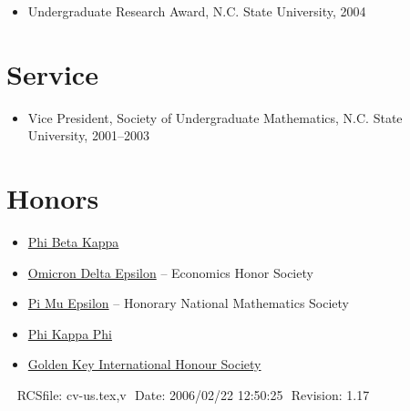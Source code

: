 \documentclass[overlapped,line,final,11pt,letterpaper]{res}
\def\Cplusplus{{\rm C\raise.5ex\hbox{\small ++}}}
\begin{document}
\begin{resume}
\begin{itemize}
\item Undergraduate Research Award, N.C. State University, 2004
\end{itemize}


\section{\bf Service}

\begin{itemize}
\item Vice President, Society of Undergraduate Mathematics, N.C. State
  University, 2001--2003
\end{itemize}


\section{\bf Honors}
\begin{itemize}
\item \href{http://www.pbk.org/}{Phi Beta Kappa}
\item \href{http://www.cba.ua.edu/~ode/}
  {Omicron Delta Epsilon} -- Economics Honor Society
\item \href{http://www.pme-math.org/}
  {Pi Mu Epsilon} -- Honorary National Mathematics Society
\item \href{http://www.phikappaphi.org/}{Phi Kappa Phi}
\item \href{http://www.goldenkey.org}{Golden Key International Honour Society}
\end{itemize}




\begin{center}
\vspace{\fill}\ \newline
{\tiny \rm $ $RCSfile: cv-us.tex,v $ $ }
{\tiny \rm $ $Date: 2006/02/22 12:50:25 $ $ }
{\tiny \rm $ $Revision: 1.17 $ $ }
\end{center}

\end{resume}
\end{document}
